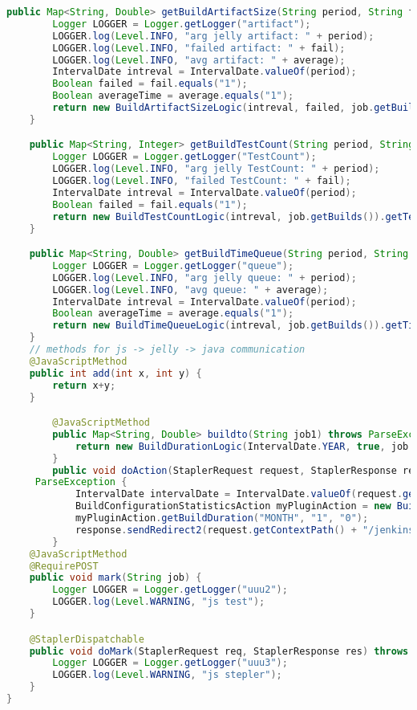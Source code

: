 \begin{lstlisting}[language=Java]
    public Map<String, Double> getBuildArtifactSize(String period, String fail, String average) throws ParseException {
        Logger LOGGER = Logger.getLogger("artifact");
        LOGGER.log(Level.INFO, "arg jelly artifact: " + period);
        LOGGER.log(Level.INFO, "failed artifact: " + fail);
        LOGGER.log(Level.INFO, "avg artifact: " + average);
        IntervalDate intreval = IntervalDate.valueOf(period);
        Boolean failed = fail.equals("1");
        Boolean averageTime = average.equals("1");
        return new BuildArtifactSizeLogic(intreval, failed, job.getBuilds()).getArtifactSize(averageTime);
    }

    public Map<String, Integer> getBuildTestCount(String period, String fail) throws ParseException {
        Logger LOGGER = Logger.getLogger("TestCount");
        LOGGER.log(Level.INFO, "arg jelly TestCount: " + period);
        LOGGER.log(Level.INFO, "failed TestCount: " + fail);
        IntervalDate intreval = IntervalDate.valueOf(period);
        Boolean failed = fail.equals("1");
        return new BuildTestCountLogic(intreval, job.getBuilds()).getTestCount();
    }

    public Map<String, Double> getBuildTimeQueue(String period, String average) throws ParseException {
        Logger LOGGER = Logger.getLogger("queue");
        LOGGER.log(Level.INFO, "arg jelly queue: " + period);
        LOGGER.log(Level.INFO, "avg queue: " + average);
        IntervalDate intreval = IntervalDate.valueOf(period);
        Boolean averageTime = average.equals("1");
        return new BuildTimeQueueLogic(intreval, job.getBuilds()).getTimeQueue(averageTime);
    }
    // methods for js -> jelly -> java communication
    @JavaScriptMethod
    public int add(int x, int y) {
        return x+y;
    }

        @JavaScriptMethod
        public Map<String, Double> buildto(String job1) throws ParseException {
            return new BuildDurationLogic(IntervalDate.YEAR, true, job.getBuilds()).getBuildsDuration(false);
        }
        public void doAction(StaplerRequest request, StaplerResponse response) throws IOException, ServletException,
     ParseException {
            IntervalDate intervalDate = IntervalDate.valueOf(request.getParameter("IntervalDate"));
            BuildConfigurationStatisticsAction myPluginAction = new BuildConfigurationStatisticsAction(job);
            myPluginAction.getBuildDuration("MONTH", "1", "0");
            response.sendRedirect2(request.getContextPath() + "/jenkins");
        }
    @JavaScriptMethod
    @RequirePOST
    public void mark(String job) {
        Logger LOGGER = Logger.getLogger("uuu2");
        LOGGER.log(Level.WARNING, "js test");
    }

    @StaplerDispatchable
    public void doMark(StaplerRequest req, StaplerResponse res) throws IOException {
        Logger LOGGER = Logger.getLogger("uuu3");
        LOGGER.log(Level.WARNING, "js stepler");
    }
}

\end{lstlisting}

